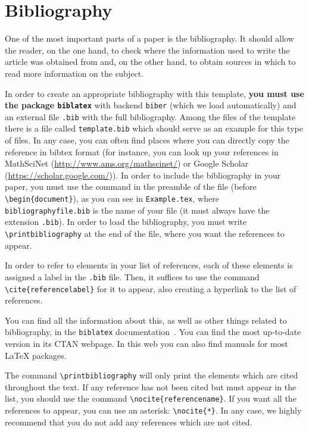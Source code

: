 \documentclass[babel-main=english]{TEMat-article}
\begin{document}
\section{Bibliography}

One of the most important parts of a paper is the bibliography. It should allow the reader, on the one hand, to check where the information used to write the article was obtained from and, on the other hand, to obtain sources in which to read more information on the subject.

In order to create an appropriate bibliography with this template, \textbf{you must use the package \texttt{biblatex}} with backend \verb+biber+ (which we load automatically) and an external file \verb+.bib+ with the full bibliography.
Among the files of the template there is a file called \verb+template.bib+ which should serve as an example for this type of files.
In any case, you can often find places where you can directly copy the reference in bibtex format (for instance, you can look up your references in MathSciNet (\url{http://www.ams.org/mathscinet/}) or Google Scholar (\url{https://scholar.google.com/})).
In order to include the bibliography in your paper, you must use the command \verb++ in the preamble of the file (before \verb+\begin{document}+), as you can see in \verb+Example.tex+, where \verb+bibliographyfile.bib+ is the name of your file (it must always have the extension \verb+.bib+).
In order to load the bibliography, you must write \verb+\printbibliography+ at the end of the file, where you want the references to appear.

In order to refer to elements in your list of references, each of these elements is assigned a label in the \verb+.bib+ file.
Then, it suffices to use the command \verb+\cite{referencelabel}+ for it to appear, also creating a hyperlink to the list of references.

You can find all the information about this, as well as other things related to bibliography, in the \verb+biblatex+ documentation~\cite{biblatex}.
You can find the most up-to-date version in its CTAN webpage.
In this web you can also find manuals for most \LaTeX{} packages.

\begin{remark}
The command \verb+\printbibliography+ will only print the elements which are cited throughout the text.
If any reference has not been cited but must appear in the list, you should use the command \verb+\nocite{referencename}+.
If you want all the references to appear, you can use an asterisk: \verb+\nocite{*}+.
In any case, we highly recommend that you do not add any references which are not cited.
\end{remark}
\end{document}

